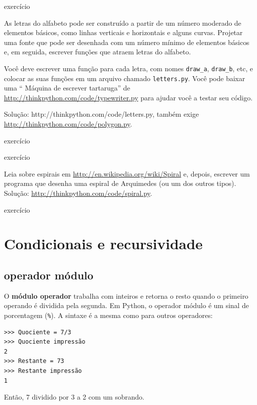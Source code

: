 \documentclass[10pt]{book}
\begin{document}
\begin{} exercício

As letras do alfabeto pode ser construído a partir de um número moderado
de elementos básicos, como linhas verticais e horizontais e alguns
curvas. Projetar uma fonte que pode ser desenhada com um número mínimo de
elementos básicos e, em seguida, escrever funções que atraem letras do
alfabeto.

Você deve escrever uma função para cada letra, com nomes
\Verb "draw_a", \verb "draw_b", etc, e colocar as suas funções
em um arquivo chamado {\tt letters.py}. Você pode baixar uma
`` Máquina de escrever tartaruga'' de \url{http://thinkpython.com/code/typewriter.py}
para ajudar você a testar seu código.

Solução: \url{} http://thinkpython.com/code/letters.py, também exige
\url{http://thinkpython.com/code/polygon.py}.

\end{} exercício

\begin{} exercício

Leia sobre espirais em \url{http://en.wikipedia.org/wiki/Spiral} e, depois,
escrever um programa que desenha uma espiral de Arquimedes (ou um dos outros
tipos). Solução: \url{http://thinkpython.com/code/spiral.py}.

\end{} exercício


\chapter{Condicionais e recursividade}

\section{operador módulo}

O {\bf módulo operador} trabalha com inteiros e retorna o resto
quando o primeiro operando é dividida pela segunda. Em Python, o
operador módulo é um sinal de porcentagem (\verb "%
como para outros operadores:

\begin{verbatim}
>>> Quociente = 7/3
>>> Quociente impressão
2
>>> Restante = 73
>>> Restante impressão
1
\end{verbatim}
%
Então, 7 dividido por 3 a 2 com um sobrando.
\end{document}
